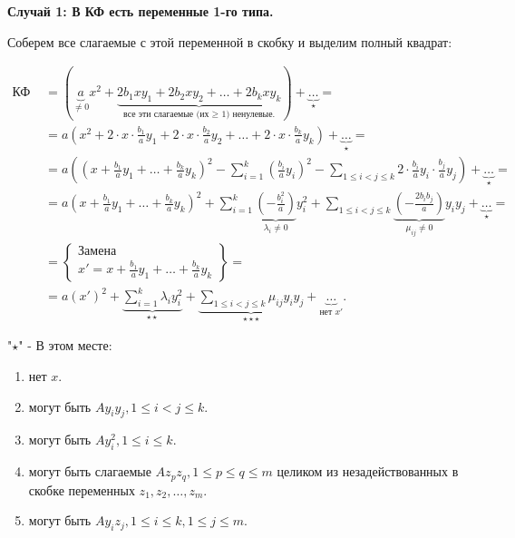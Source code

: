 \textbf{Случай 1: В КФ есть переменные 1-го типа.}

Соберем все слагаемые с этой переменной в скобку и выделим полный квадрат:

\begin{align}
    \text{КФ } &= (\underbrace{a}_{\ne 0}x^2 + \underbrace{2b_1xy_1 + 2b_2xy_2 + \ldots + 2b_kxy_k}_{\text{все эти слагаемые (их }\geq \text{ 1) ненулевые.}}) + \underbrace{\ldots}_{\star} = \\
    &= a(x^2 + 2\cdot x\cdot\frac{b_1}{a}y_1 + 2\cdot x\cdot\frac{b_2}{a}y_2 + \ldots + 2\cdot x\cdot\frac{b_k}{a}y_k) + \underbrace{\ldots}_{\star} = \\
    &= a\left((x + \frac{b_1}{a}y_1 + \ldots + \frac{b_k}{a}y_k)^2 - \sum_{i = 1}^k(\frac{b_i}{a}y_i)^2 - \sum_{1 \leq i < j \leq k}2\cdot\frac{b_i}{a}y_i\cdot \frac{b_j}{a}y_j\right) + \underbrace{\ldots}_{\star} = \\
    &= a(x + \frac{b_1}{a}y_1 + \ldots + \frac{b_k}{a}y_k)^2 + \sum_{i = 1}^k\underbrace{\left(-\frac{b^2_i}{a}\right)}_{\lambda_i \ne 0}y^2_i + \sum_{1 \leq i < j \leq k}\underbrace{\left(-\frac{2b_ib_j}{a}\right)}_{\mu_{ij} \ne 0}y_iy_j + \underbrace{\ldots}_{\star} = \\
    &=\left\{ 
            \begin{array}{l}
                \text{Замена} \\
                x' = x + \frac{b_1}{a}y_1 + \ldots + \frac{b_k}{a}y_k
            \end{array} \right\} = \\
    &= a(x')^2 + \underbrace{\sum_{i = 1}^k\lambda_iy^2_i}_{\star\star} + \underbrace{\sum_{1 \leq i < j \leq k}\mu_{ij}y_iy_j}_{\star\star\star} + \underbrace{\ldots}_{\text{нет }x'}.
\end{align}

\newpage

"$\star$" - В этом месте:

\begin{enumerate}
    \item нет $x$.
    \item могут быть $Ay_iy_j, 1\leq i < j \leq k$.
    \item могут быть $Ay^2_i, 1 \leq i \leq k$.
    \item могут быть слагаемые $Az_pz_q, 1 \leq p \leq q \leq m$ целиком из незадействованных в скобке переменных $z_1, z_2, \ldots, z_m$.
    \item могут быть $Ay_iz_j, 1\leq i\leq k, 1\leq j\leq m$.
\end{enumerate}


